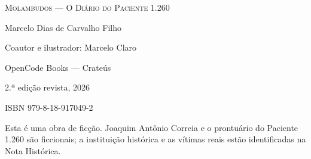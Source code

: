 \cleardoublepage
\thispagestyle{empty}
\begingroup
\centering
\vspace*{\fill}
{\scshape\large Molambudos --- O Diário do Paciente 1.260\par}
\vspace{0.8em}
{\small Marcelo Dias de Carvalho Filho\par}
{\small Coautor e ilustrador: Marcelo Claro\par}
\vspace{1.2em}
{\small OpenCode Books --- Crateús\par}
{\small 2.ª edição revista, 2026\par}
\vspace{0.6em}
{\footnotesize ISBN 979-8-18-917049-2\par}
\vspace{1.2em}
{\footnotesize Esta é uma obra de ficção. Joaquim Antônio Correia e o
prontuário do Paciente 1.260 são ficcionais; a instituição histórica e as
vítimas reais estão identificadas na Nota Histórica.\par}
\vspace*{\fill}
\endgroup
\clearpage
